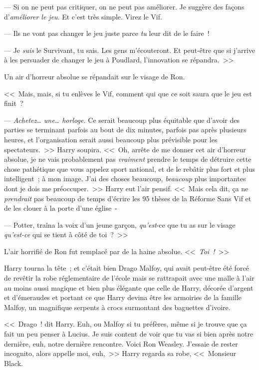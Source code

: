 --- Si on ne peut pas critiquer, on ne peut pas améliorer. Je suggère des façons d'\emph{améliorer le jeu}. Et c'est très simple. Virez le Vif.

--- Ils ne vont pas changer le jeu juste parce \emph{tu} leur dit de le faire~!

--- Je \emph{suis} le Survivant, tu sais. Les gens m'écouteront. Et peut-être que si j'arrive à les persuader de changer le jeu à Poudlard, l'innovation se répandra.~>>

Un air d'horreur absolue se répandait sur le visage de Ron. 

<<~Mais, mais, si tu enlèves le Vif, comment qui que ce soit saura que le jeu est finit~?

--- \emph{Achetez… une… horloge.} Ce serait beaucoup plus équitable que d'avoir des parties se terminant parfois au bout de dix minutes, parfois pas après plusieurs heures, et l'organisation serait aussi beaucoup plus prévisible pour les spectateurs.~>> Harry soupira. <<~Oh, arrête de me donner cet air d'horreur absolue, je ne vais probablement pas \emph{vraiment} prendre le temps de détruire cette chose pathétique que vous appelez sport national, et de le rebâtir plus fort et plus intelligent~; à mon image. J'ai des choses beaucoup, \emph{beaucoup} plus importantes dont je dois me préoccuper.~>> Harry eut l'air pensif. <<~Mais cela dit, ça ne \emph{prendrait} pas beaucoup de temps d'écrire les 95 thèses de la Réforme Sans Vif et de les clouer à la porte d'une église~-

--- Potter, traîna la voix d'un jeune garçon, \emph{qu'est}-ce que tu as sur le visage \emph{qu'est-ce} qui se tient à côté de toi~?~>>

L'air horrifié de Ron fut remplacé par de la haine absolue. <<~\emph{Toi~!}~>>

Harry tourna la tête~; et c'était bien Drago Malfoy, qui avait peut-être été forcé de revêtir la robe réglementaire de l'école mais se rattrapait avec une malle à l'air au moins aussi magique et bien plus élégante que celle de Harry, décorée d'argent et d'émeraudes et portant ce que Harry devina être les armoiries de la famille Malfoy, un magnifique serpents à crocs surmontant des baguettes d'ivoire.

<<~Drago~! dit Harry. Euh, ou Malfoy si tu préfères, même si je trouve que ça fait un peu penser à Lucius. Je suis content de voir que tu vas si bien après notre dernière, euh, notre dernière rencontre. Voici Ron Weasley. J'essaie de rester incognito, alors appelle moi, euh,~>> Harry regarda sa robe, <<~Monsieur Black.

